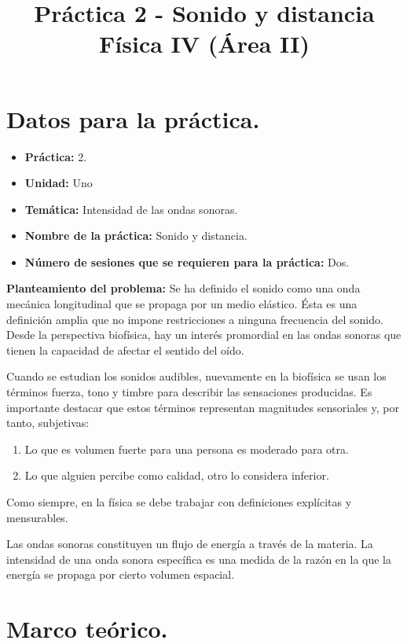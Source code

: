 \documentclass[14pt]{extarticle}
\title{\vspace*{-2cm} Práctica 2 - Sonido y distancia \\  Física IV (Área II) \vspace{-5ex}}
\date{}
\begin{document}
\maketitle

\section{Datos para la práctica.}

\begin{itemize}
\itemsep0em 
\item  \textbf{Práctica:} 2.
\item \textbf{Unidad:} Uno
\item \textbf{Temática:} Intensidad de las ondas sonoras.
\item \textbf{Nombre de la práctica:} Sonido y distancia.
\item \textbf{Número de sesiones que se requieren para la práctica:} Dos.
\end{itemize}
\textbf{Planteamiento del problema:} Se ha definido el sonido como una onda mecánica longitudinal que se propaga por un medio elástico. Ésta es una definición amplia que no impone restricciones a ninguna frecuencia del sonido. Desde la perspectiva biofísica, hay un interés promordial en las ondas sonoras que tienen la capacidad de afectar el sentido del oído.

Cuando se estudian los sonidos audibles, nuevamente en la biofísica se usan los términos fuerza, tono y timbre para describir las sensaciones producidas. Es importante destacar que estos términos representan magnitudes sensoriales y, por tanto, subjetivas:
\begin{enumerate}[label=\alph*)]
\itemsep0em 
\item Lo que es volumen fuerte para una persona es moderado para otra.
\item Lo que alguien percibe como calidad, otro lo considera inferior.
\end{enumerate}
Como siempre, en la física se debe trabajar con definiciones explícitas y mensurables.

Las ondas sonoras constituyen un flujo de energía a través de la materia. La intensidad de una onda sonora específica es una medida de la razón en la que la energía se propaga por cierto volumen espacial.

\section{Marco teórico.}
\end{document}
